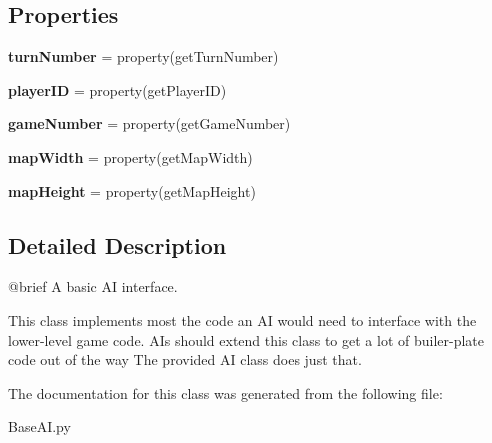 \subsection*{\-Properties}
\begin{DoxyCompactItemize}
\item 
\hypertarget{classBaseAI_1_1BaseAI_aad7e55e72604dc7e4ec21611668fb15a}{{\bfseries turn\-Number} = property(get\-Turn\-Number)}\label{classBaseAI_1_1BaseAI_aad7e55e72604dc7e4ec21611668fb15a}

\item 
\hypertarget{classBaseAI_1_1BaseAI_a9ca0e2026d5753b11a123cf4463fb01c}{{\bfseries player\-I\-D} = property(get\-Player\-I\-D)}\label{classBaseAI_1_1BaseAI_a9ca0e2026d5753b11a123cf4463fb01c}

\item 
\hypertarget{classBaseAI_1_1BaseAI_a29d9dfbe07078a57a350f788a3640ccc}{{\bfseries game\-Number} = property(get\-Game\-Number)}\label{classBaseAI_1_1BaseAI_a29d9dfbe07078a57a350f788a3640ccc}

\item 
\hypertarget{classBaseAI_1_1BaseAI_af20b4fe9a0c9c96f0dae7db51f5bfcfe}{{\bfseries map\-Width} = property(get\-Map\-Width)}\label{classBaseAI_1_1BaseAI_af20b4fe9a0c9c96f0dae7db51f5bfcfe}

\item 
\hypertarget{classBaseAI_1_1BaseAI_a33210a162a644079740c00388fb69f42}{{\bfseries map\-Height} = property(get\-Map\-Height)}\label{classBaseAI_1_1BaseAI_a33210a162a644079740c00388fb69f42}

\end{DoxyCompactItemize}


\subsection{\-Detailed \-Description}
\begin{DoxyVerb}@brief A basic AI interface.

This class implements most the code an AI would need to interface with the lower-level game code.
AIs should extend this class to get a lot of builer-plate code out of the way
The provided AI class does just that.
\end{DoxyVerb}
 

\-The documentation for this class was generated from the following file\-:\begin{DoxyCompactItemize}
\item 
\-Base\-A\-I.\-py\end{DoxyCompactItemize}
